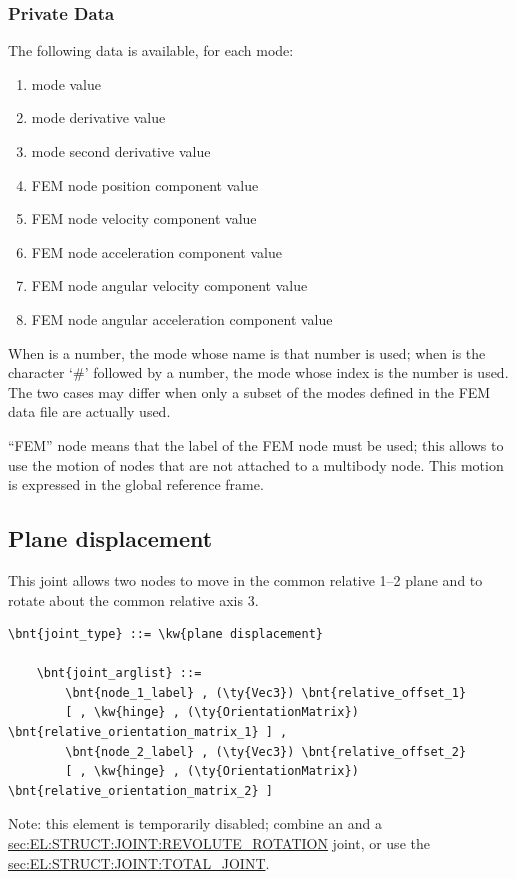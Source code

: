 \subsubsection{Private Data}
The following data is available, for each mode:
\begin{enumerate}
\item {} mode  value
\item {} mode  derivative value
\item {} mode  second derivative value
\item {} FEM node  position  component value
\item {} FEM node  velocity  component value
\item {} FEM node  acceleration  component value
\item {} FEM node  angular velocity  component value
\item {} FEM node  angular acceleration  component value
\end{enumerate}
When  is a number, the mode whose name is that number is used;
when  is the character `\#' followed by a number,
the mode whose index is the number is used.
The two cases may differ when only a subset of the modes defined
in the FEM data file are actually used.

``FEM'' node means that the label of the FEM node must be used;
this allows to use the motion of nodes that are not attached
to a multibody node.
This motion is expressed in the global reference frame.




\subsection{Plane displacement}\label{sec:EL:STRUCT:JOINT:PLANE_DISPLACEMENT}
This joint allows two nodes to move in the common relative 1--2 plane 
and to rotate about the common relative axis 3.
\begin{Verbatim}[commandchars=\\\{\}]
    \bnt{joint_type} ::= \kw{plane displacement}

    \bnt{joint_arglist} ::= 
        \bnt{node_1_label} , (\ty{Vec3}) \bnt{relative_offset_1}
        [ , \kw{hinge} , (\ty{OrientationMatrix}) \bnt{relative_orientation_matrix_1} ] ,
        \bnt{node_2_label} , (\ty{Vec3}) \bnt{relative_offset_2}
        [ , \kw{hinge} , (\ty{OrientationMatrix}) \bnt{relative_orientation_matrix_2} ]
\end{Verbatim}
Note: this element is temporarily disabled;
combine an  and a
\hyperref{\kw{revolute rotation}}{\kw{revolute rotation} (see Section~}{)}{sec:EL:STRUCT:JOINT:REVOLUTE_ROTATION}
joint, or use the 
\hyperref{\kw{total joint}}{\kw{total joint}, see Section~}{}{sec:EL:STRUCT:JOINT:TOTAL_JOINT}.

